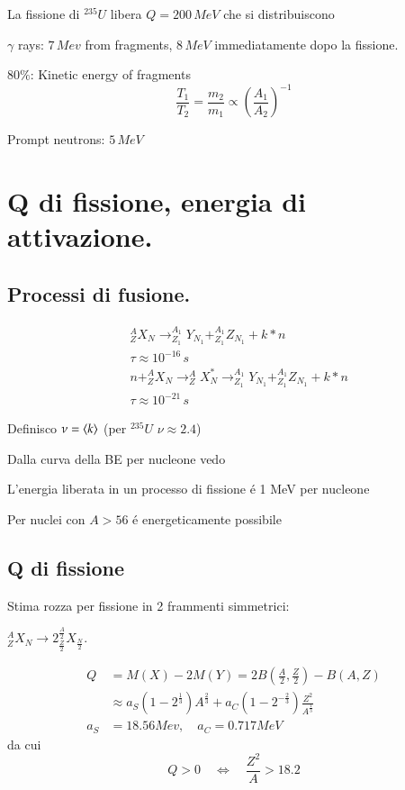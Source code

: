 La fissione di $^{235}U$ libera $Q=200\,MeV$ che si distribuiscono
\begin{itemize*}
\item $\gamma$ rays: $7\,Mev$ from fragments, $8\,MeV$ immediatamente dopo la fissione.
\item $80\%$: Kinetic energy of fragments
\begin{equation*}
\frac{T_1}{T_2}=\frac{m_2}{m_1}\propto(\frac{A_1}{A_2})^{-1}
\end{equation*}
\item Prompt neutrons: $5\,MeV$
\end{itemize*}

\clearpage

\section{Q di fissione, energia di attivazione.}

\subsection{Processi di fusione.}

\begin{align*}
&^A_ZX_N\to^{A_1}_{Z_1}Y_{N_1}+^{A_1}_{Z_1}Z_{N_1}+k*n\\
&\tau\approx10^{-16}\,s\\
&n+^A_ZX_N\to^A_ZX_N^*\to^{A_1}_{Z_1}Y_{N_1}+^{A_1}_{Z_1}Z_{N_1}+k*n\\
&\tau\approx10^{-21}\,s
\end{align*}

Definisco $\nu=\langle k \rangle$ (per $^{235}U$ $\nu\approx2.4$)

Dalla curva della BE per nucleone vedo
\begin{itemize*}
\item L'energia liberata in un processo di fissione \'e 1 MeV per nucleone
\item Per nuclei con $A>56$ \'e energeticamente possibile
\end{itemize*}

\subsection{Q di fissione}

Stima rozza per fissione in 2 frammenti simmetrici:

$^A_ZX_N\to2^{\frac{A}{2}}_{\frac{Z}{2}}X_{\frac{N}{2}}$.

\begin{align*}
Q&=M(X)-2M(Y)=2B({\frac{A}{2}},{\frac{Z}{2}})-B(A,Z)\\
&\approx a_S(1-2^{\frac{1}{3}})A^{\frac{2}{3}}+a_C(1-2^{-\frac{2}{3}})\frac{Z^2}{A^{\frac{1}{3}}}\\
a_S&=18.56 Mev,\quad a_C=0.717 MeV
\end{align*}
da cui 
\begin{equation*}
Q>0\quad\Leftrightarrow\quad\frac{Z^2}{A}>18.2
\end{equation*}


